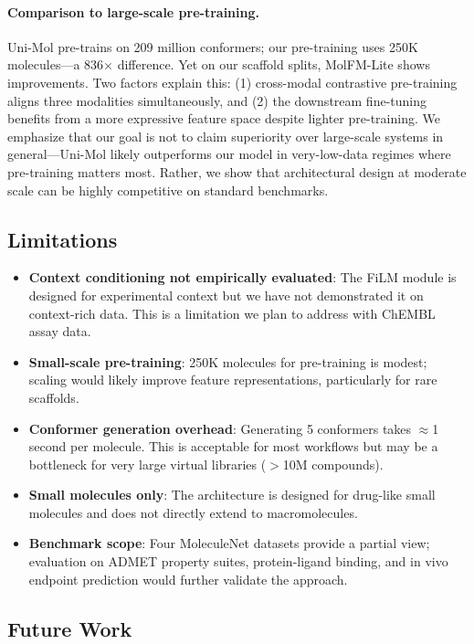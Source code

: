 \documentclass[11pt]{article}
\newcommand{\modelname}{MolFM-Lite}
\begin{document}
\paragraph{Comparison to large-scale pre-training.}
Uni-Mol pre-trains on 209 million conformers; our pre-training uses 250K molecules---a 836$\times$ difference. Yet on our scaffold splits, \modelname{} shows improvements. Two factors explain this: (1) cross-modal contrastive pre-training aligns three modalities simultaneously, and (2) the downstream fine-tuning benefits from a more expressive feature space despite lighter pre-training. We emphasize that our goal is not to claim superiority over large-scale systems in general---Uni-Mol likely outperforms our model in very-low-data regimes where pre-training matters most. Rather, we show that architectural design at moderate scale can be highly competitive on standard benchmarks.

\subsection{Limitations}
\label{sec:limitations}

\begin{itemize}[leftmargin=*,itemsep=2pt]
    \item \textbf{Context conditioning not empirically evaluated}: The FiLM module is designed for experimental context but we have not demonstrated it on context-rich data. This is a limitation we plan to address with ChEMBL assay data.
    \item \textbf{Small-scale pre-training}: 250K molecules for pre-training is modest; scaling would likely improve feature representations, particularly for rare scaffolds.
    \item \textbf{Conformer generation overhead}: Generating 5 conformers takes $\approx$1 second per molecule. This is acceptable for most workflows but may be a bottleneck for very large virtual libraries ($>$10M compounds).
    \item \textbf{Small molecules only}: The architecture is designed for drug-like small molecules and does not directly extend to macromolecules.
    \item \textbf{Benchmark scope}: Four MoleculeNet datasets provide a partial view; evaluation on ADMET property suites, protein-ligand binding, and in vivo endpoint prediction would further validate the approach.
\end{itemize}

\subsection{Future Work}
\end{document}
